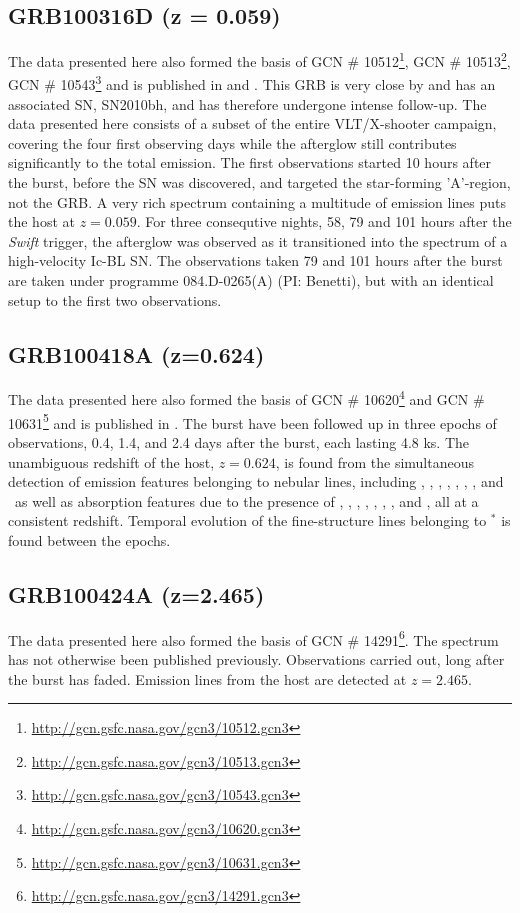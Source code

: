 \documentclass{aa}    %
\begin{document}
\subsection{GRB100316D (z = 0.059)}
The data presented here also formed the basis of GCN \#
10512\footnote{\url{http://gcn.gsfc.nasa.gov/gcn3/10512.gcn3}}, GCN \#
10513\footnote{\url{http://gcn.gsfc.nasa.gov/gcn3/10513.gcn3}}, GCN \#
10543\footnote{\url{http://gcn.gsfc.nasa.gov/gcn3/10543.gcn3}} and is published
in \citet{Bufano2012} and \citet{Starling2011}. This GRB is very close by and
has an associated SN, SN2010bh, and has therefore undergone intense follow-up. The data
presented here consists of a subset of the entire VLT/X-shooter campaign,
covering the four first observing days while the afterglow still contributes
significantly to the total emission. The first observations started 10 hours
after the burst, before the SN was discovered, and targeted the star-forming
'A'-region\citep{Starling2011}, not the GRB. A very rich spectrum containing a
multitude of emission lines puts the host at $z = 0.059$. For three consequtive
nights, 58, 79 and 101 hours after the \textit{Swift} trigger, the afterglow
was observed as it transitioned into the spectrum of a high-velocity Ic-BL SN.
The observations taken 79 and 101 hours after the burst are taken under
programme 084.D-0265(A) (PI: Benetti), but with an identical setup to the first
two observations.

\subsection{GRB100418A (z=0.624)}
The data presented here also formed the basis of GCN \#
10620\footnote{\url{http://gcn.gsfc.nasa.gov/gcn3/10620.gcn3}} and GCN \#
10631\footnote{\url{http://gcn.gsfc.nasa.gov/gcn3/10631.gcn3}} and is published
in \citet{DeUgartePostigo2011}. The burst have been followed up in three epochs
of observations, 0.4, 1.4, and 2.4 days after the burst, each lasting 4.8 ks.
The unambiguous redshift of the host, $z=0.624$, is found from the simultaneous
detection of emission features belonging to nebular lines, including \hi, \oii,
\oiii, \neiii, \nii, \sii, \siii, and \hei~as well as absorption features due
to the presence of \znii, \crii, \feii, \mnii, \mgii, \mgi, \tiii, and \caii,
all at a consistent redshift. Temporal evolution of the fine-structure lines
belonging to \feii$^*$ is found between the epochs.

\subsection{GRB100424A (z=2.465)}
The data presented here also formed the basis of GCN \#
14291\footnote{\url{http://gcn.gsfc.nasa.gov/gcn3/14291.gcn3}}. The spectrum
has not otherwise been published previously. Observations carried out, long
after the burst has faded.  Emission lines from the host are detected at
$z=2.465$.
\end{document}
